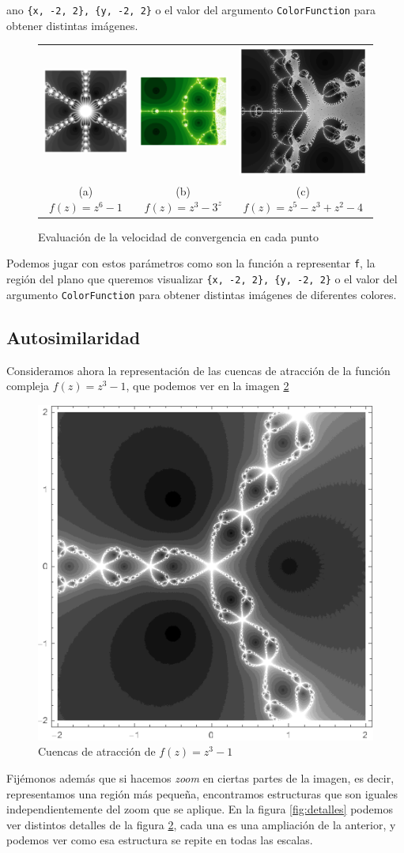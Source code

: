 ano \verb|{x, -2, 2}, {y, -2, 2}| o el valor del argumento \verb|ColorFunction| para obtener distintas imágenes.

\begin{figure}[ht]
    \centering
    \begin{tabular}{ccc}
      \includegraphics[scale=0.33]{img/cuencas-velocidad-1.png} &   \includegraphics[scale=0.31]{img/cuencas-velocidad-2.png} &   \includegraphics[scale=0.33]{img/cuencas-velocidad-3.png} \\
      (a) $f(z)=z^6-1$ & (b) $f(z)=z^3-3^z$ & (c) $f(z)=z^5-z^3+z^2-4$ \\[6pt]
    \end{tabular}
    \caption{Evaluación de la velocidad de convergencia en cada punto}
    \label{fig:cuencas-velocidad}
\end{figure}

Podemos jugar con estos parámetros como son la función a representar \verb|f|, la región del plano que queremos visualizar \verb|{x, -2, 2}, {y, -2, 2}| o el valor del argumento \verb|ColorFunction| para obtener distintas imágenes de diferentes colores.

\subsection{Autosimilaridad}
\label{subsection:autosimilaridad}

Consideramos ahora la representación de las cuencas de atracción de la función compleja $f(z)=z^3-1$, que podemos ver en la imagen \ref{fig:cuencas-autosimilaridad}

\begin{figure} [ht]
\centering
\includegraphics[scale = 0.5]{img/cuencas-autosimilaridad.png}
\caption{Cuencas de atracción de $f(z)=z^3-1$}
    \label{fig:cuencas-autosimilaridad}
\end{figure}

\newpage

Fijémonos además que si hacemos \textit{zoom} en ciertas partes de la imagen, es decir, representamos una región más pequeña, encontramos estructuras que son iguales independientemente del zoom que se aplique. En la figura \ref{fig:detalles} podemos ver distintos detalles de la figura \ref{fig:cuencas-autosimilaridad}, cada una es una ampliación de la anterior, y podemos ver como esa estructura se repite en todas las escalas.